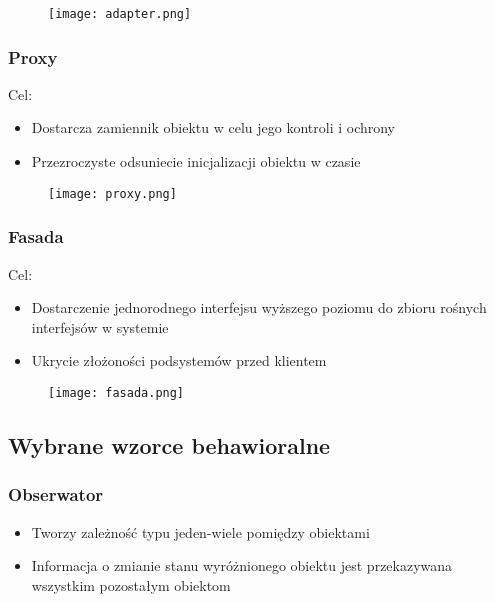 \documentclass[a4paper]{article}
\begin{document}
    \begin{figure}[H]
        \texttt{[image: adapter.png]}
    \end{figure}

    \subsubsection{Proxy}
    Cel:
    \begin{itemize}
        \item Dostarcza zamiennik obiektu w celu jego kontroli i ochrony
        \item Przezroczyste odsuniecie inicjalizacji obiektu w czasie
    \end{itemize}

    \begin{figure}[H]
        \texttt{[image: proxy.png]}
    \end{figure}



    \subsubsection{Fasada}
    Cel:
    \begin{itemize}
        \item Dostarczenie jednorodnego interfejsu wyższego poziomu do zbioru
        rośnych interfejsów w systemie
        \item Ukrycie złożoności podsystemów przed klientem
    \end{itemize}

    \begin{figure}[H]
        \texttt{[image: fasada.png]}
    \end{figure}




    \subsection{Wybrane wzorce behawioralne}

    \subsubsection{Obserwator}
    \begin{itemize}
        \item Tworzy zależność typu jeden-wiele pomiędzy obiektami
        \item Informacja o zmianie stanu wyróżnionego obiektu jest przekazywana
        wszystkim pozostałym obiektom
    \end{itemize}
\end{document}
